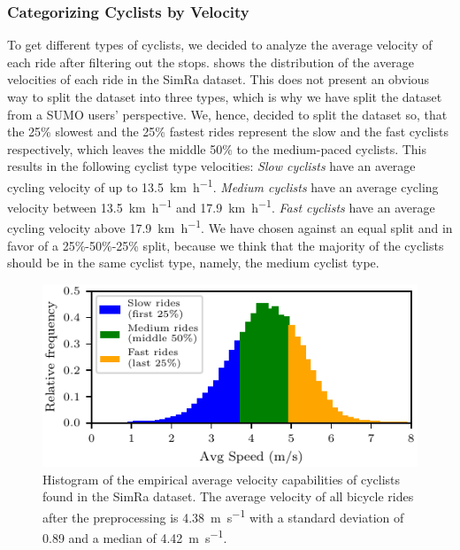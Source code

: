 \subsubsection{Categorizing Cyclists by Velocity}
\label{subsubsec:categorizing_by_velocity_preprocessing}
To get different types of cyclists, we decided to analyze the average velocity of each ride after filtering out the stops.
 shows the distribution of the average velocities of each ride in the SimRa dataset.
This does not present an obvious way to split the dataset into three types, which is why we have split the dataset from a SUMO users' perspective.
We, hence, decided to split the dataset so, that the \num{25}\% slowest and the \num{25}\% fastest rides represent the slow and the fast cyclists respectively, which leaves the middle \num{50}\% to the medium-paced cyclists.
This results in the following cyclist type velocities:
\textit{Slow cyclists} have an average cycling velocity of up to \SI{13.5}{\km\per\hour}.
\textit{Medium cyclists} have an average cycling velocity between \SI{13.5}{\km\per\hour} and \SI{17.9}{\km\per\hour}.
\textit{Fast cyclists} have an average cycling velocity above \SI{17.9}{\km\per\hour}.
We have chosen against an equal split and in favor of a \num{25}\%-\num{50}\%-\num{25}\% split, because we think that the majority of the cyclists should be in the same cyclist type, namely, the medium cyclist type.
\begin{figure}
  \centering
    \includegraphics[width=\columnwidth]{fig/analysis_avg_velo_all.pdf}
    \caption{%
        Histogram of the empirical average velocity capabilities of cyclists found in the SimRa dataset. The average velocity of all bicycle rides after the preprocessing is \SI{4.38}{\metre\per\second} with a standard deviation of \num{0.89} and a median of \SI{4.42}{\metre\per\second}.
    }%
    \label{fig:analysis_avg_vel_all}
\end{figure}

